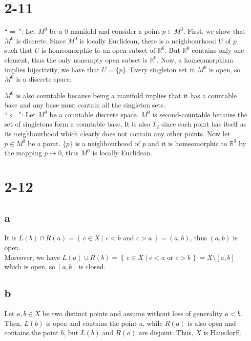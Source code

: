 \documentclass[a4paper]{book}
\theoremstyle{definition}
\newcommand{\makeset}[2]{\left\{\, #1 \mid #2 \,\right\}}
\begin{document}
\section*{2-11}

``\(\Rightarrow\)'': Let \(M^0\) be a \(0\)-manifold and consider a point \(p \in M^0\). First, we show that \(M^0\) is discrete. Since \(M^0\) is locally Euclidean, there is a neighbourhood \(U\) of \(p\) such that \(U\) is homeomorphic to an open subset of \(\mathbb{R}^0\). But \(\mathbb{R}^0\) contains only one element, thus the only nonempty open subset is \(\mathbb{R}^0\). Now, a homeomorphism implies bijectivity, we have that \(U = \{p\}\). Every singleton set in \(M^0\) is open, so \(M^0\) is a discrete space.

\(M^0\) is also countable because being a manifold implies that it has a countable base and any base must contain all the singleton sets. \\

\noindent ``\(\Leftarrow\)'': Let \(M^0\) be a countable discrete space. \(M^0\) is second-countable because the set of singletons form a countable base. It is also \(T_2\) since each point has itself as its neighbourhood which clearly does not contain any other points. Now let \(p \in M^0\) be a point. \(\{p\}\) is a neighbourhood of \(p\) and it is homeomorphic to \(\mathbb{R}^0\) by the mapping \(p \mapsto 0\), thus \(M^0\) is locally Euclidean.

\section*{2-12}

\subsection*{a}
It is \(L(b) \cap R(a) = \makeset{c \in X}{c < b \text{ and } c > a} = (a, b)\), thus \((a, b)\) is open. \\

\noindent Moreover, we have \(L(a) \cup R(b) = \makeset{c \in X}{c < a \text{ or } c > b} = X \setminus [a, b]\) which is open, so \([a, b]\) is closed.

\subsection*{b}

Let \(a, b \in X\) be two distinct points and assume without loss of generality \(a < b\). Then, \(L(b)\) is open and contains the point \(a\), while \(R(a)\) is also open and contains the point \(b\), but \(L(b)\) and \(R(a)\) are disjoint. Thus, \(X\) is Hausdorff.
\end{document}
